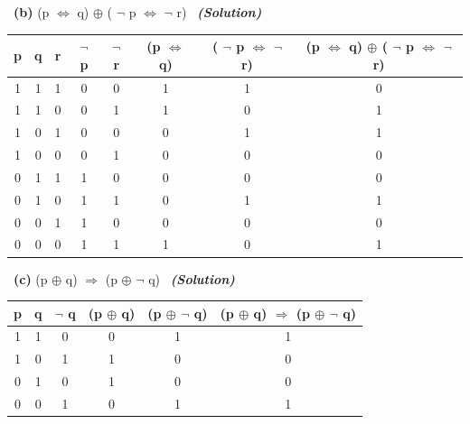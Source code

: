 \documentclass[a4 paper]{article}
\numberwithin{equation}{section}
\newcommand{\subproblem}[1]{~\newline\textbf{(#1)}}
\newcommand{\solution}{~\newline\textbf{\textit{(Solution)}} }
\newcommand{\0}{\mathbf{0}}
\begin{document}
\subproblem{b} (p $\iff$ q) $\oplus$ ( $\neg$ p $\iff$ $\neg$ r)
\solution 
\newline
\begin{b}[2]
\begin{tabular}{|c|c|c|c|c|c|c|c|}
\hline
p & q & r & $\neg$ p & $\neg$ r & (p $\iff$ q) & ( $\neg$ p $\iff$ $\neg$ r) & (p $\iff$ q) $\oplus$ ( $\neg$ p $\iff$ $\neg$ r) \\ \hline
1 & 1 & 1 & 0        & 0        & 1            & 1                           & 0                                                 \\ \hline
1 & 1 & 0 & 0        & 1        & 1            & 0                           & 1                                                 \\ \hline
1 & 0 & 1 & 0        & 0        & 0            & 1                           & 1                                                 \\ \hline
1 & 0 & 0 & 0        & 1        & 0            & 0                           & 0                                                 \\ \hline
0 & 1 & 1 & 1        & 0        & 0            & 0                           & 0                                                 \\ \hline
0 & 1 & 0 & 1        & 1        & 0            & 1                           & 1                                                 \\ \hline
0 & 0 & 1 & 1        & 0        & 0            & 0                           & 0                                                 \\ \hline
0 & 0 & 0 & 1        & 1        & 1            & 0                           & 1                                                 \\ \hline
\end{tabular}
\end{b}
\newline

\subproblem{c} (p $\oplus$ q) $\Rightarrow$ (p $\oplus$ $\neg$ q)
\solution
\newline
\begin{c}[3]
\begin{tabular}{|c|c|c|c|c|c|}
\hline
p & q & $\neg$ q & (p $\oplus$ q) & (p $\oplus$ $\neg$ q) & (p $\oplus$ q) $\Rightarrow$ (p $\oplus$ $\neg$ q) \\ \hline
1 & 1 & 0        & 0              & 1                     & 1                                                  \\ \hline
1 & 0 & 1        & 1              & 0                     & 0                                                  \\ \hline
0 & 1 & 0        & 1              & 0                     & 0                                                  \\ \hline
0 & 0 & 1        & 0              & 1                     & 1                                                  \\ \hline
\end{tabular}
\end{c}
\newpage
\end{document}
